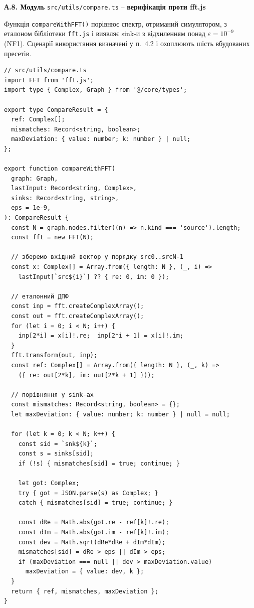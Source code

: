 \documentclass[
]{article}
\begin{document}
\textbf{А.8. Модуль} \texttt{src/utils/compare.ts} -- \textbf{верифікація
проти fft.js}

Функція \texttt{compareWithFFT()} порівнює спектр, отриманий
симулятором, з еталоном бібліотеки \texttt{fft.js} і виявляє sink-и з
відхиленням понад \(\varepsilon = 10^{- 9}\) (NF1). Сценарії
використання визначені у п.~4.2 і охоплюють шість вбудованих пресетів.

\begin{verbatim}
// src/utils/compare.ts
import FFT from 'fft.js';
import type { Complex, Graph } from '@/core/types';

export type CompareResult = {
  ref: Complex[];
  mismatches: Record<string, boolean>;
  maxDeviation: { value: number; k: number } | null;
};

export function compareWithFFT(
  graph: Graph,
  lastInput: Record<string, Complex>,
  sinks: Record<string, string>,
  eps = 1e-9,
): CompareResult {
  const N = graph.nodes.filter((n) => n.kind === 'source').length;
  const fft = new FFT(N);

  // зберемо вхідний вектор у порядку src0..srcN-1
  const x: Complex[] = Array.from({ length: N }, (_, i) =>
    lastInput[`src${i}`] ?? { re: 0, im: 0 });

  // еталонний ДПФ
  const inp = fft.createComplexArray();
  const out = fft.createComplexArray();
  for (let i = 0; i < N; i++) {
    inp[2*i] = x[i]!.re;  inp[2*i + 1] = x[i]!.im;
  }
  fft.transform(out, inp);
  const ref: Complex[] = Array.from({ length: N }, (_, k) =>
    ({ re: out[2*k], im: out[2*k + 1] }));

  // порівняння у sink-ах
  const mismatches: Record<string, boolean> = {};
  let maxDeviation: { value: number; k: number } | null = null;

  for (let k = 0; k < N; k++) {
    const sid = `snk${k}`;
    const s = sinks[sid];
    if (!s) { mismatches[sid] = true; continue; }

    let got: Complex;
    try { got = JSON.parse(s) as Complex; }
    catch { mismatches[sid] = true; continue; }

    const dRe = Math.abs(got.re - ref[k]!.re);
    const dIm = Math.abs(got.im - ref[k]!.im);
    const dev = Math.sqrt(dRe*dRe + dIm*dIm);
    mismatches[sid] = dRe > eps || dIm > eps;
    if (maxDeviation === null || dev > maxDeviation.value)
      maxDeviation = { value: dev, k };
  }
  return { ref, mismatches, maxDeviation };
}
\end{verbatim}
\end{document}

